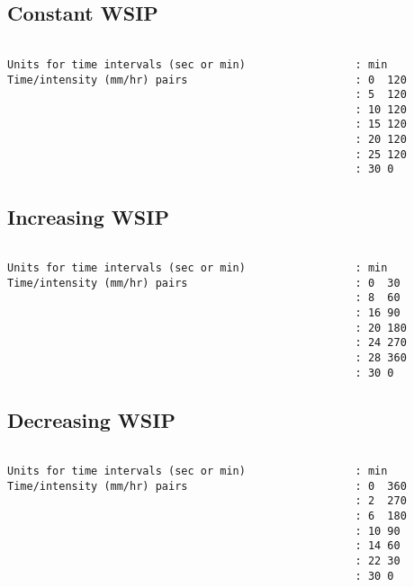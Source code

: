 \subsection{Constant WSIP}

\begin{verbatim}

Units for time intervals (sec or min)                 : min
Time/intensity (mm/hr) pairs                          : 0  120
                                                      : 5  120
                                                      : 10 120
                                                      : 15 120
                                                      : 20 120
                                                      : 25 120
                                                      : 30 0

\end{verbatim}

\subsection{Increasing WSIP}

\begin{verbatim}

Units for time intervals (sec or min)                 : min
Time/intensity (mm/hr) pairs                          : 0  30
                                                      : 8  60
                                                      : 16 90
                                                      : 20 180
                                                      : 24 270
                                                      : 28 360
                                                      : 30 0
\end{verbatim}

\subsection{Decreasing WSIP}

\begin{verbatim}

Units for time intervals (sec or min)                 : min
Time/intensity (mm/hr) pairs                          : 0  360
                                                      : 2  270
                                                      : 6  180
                                                      : 10 90
                                                      : 14 60
                                                      : 22 30
                                                      : 30 0

\end{verbatim}

